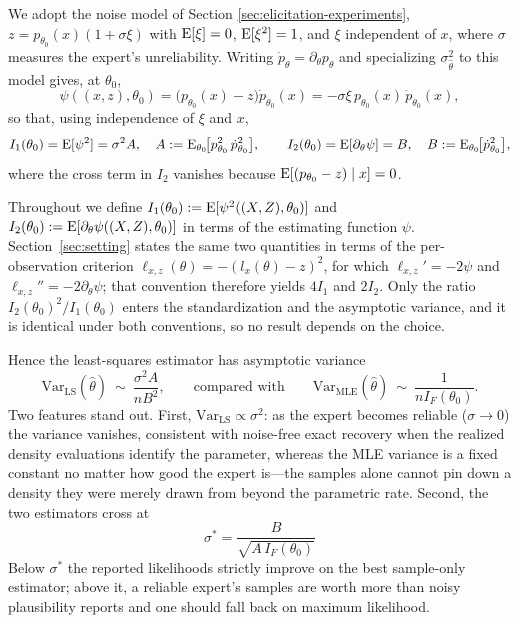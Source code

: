 We adopt the noise model of Section \ref{sec:elicitation-experiments}, $z=p_{\theta_0}(x)(1+\sigma\xi)$ with $\mathrm{E}[\xi]=0$, $\mathrm{E}[\xi^2]=1$, and $\xi$ independent of $x$, where $\sigma$ measures the expert's unreliability. Writing $\dot p_\theta = \partial_\theta p_\theta$ and specializing $\sigma_{\hat\theta}^2$ to this model gives, at $\theta_0$,
\[
\psi((x,z),\theta_0) = \big(p_{\theta_0}(x)-z\big)\dot p_{\theta_0}(x) = -\sigma\xi\, p_{\theta_0}(x)\,\dot p_{\theta_0}(x),
\]
so that, using independence of $\xi$ and $x$,
\[
I_1(\theta_0)=\mathrm{E}[\psi^2]=\sigma^2 A,\quad A:=\mathrm{E}_{\theta_0}\!\big[p_{\theta_0}^2\,\dot p_{\theta_0}^2\big], \qquad
I_2(\theta_0)=\mathrm{E}[\partial_\theta\psi]=B,\quad B:=\mathrm{E}_{\theta_0}\!\big[\dot p_{\theta_0}^2\big],
\]
where the cross term in $I_2$ vanishes because $\mathrm{E}[(p_{\theta_0}-z)\mid x]=0$.

\begin{remark}
Throughout we define $I_1(\theta_0):=\mathrm{E}[\psi^2((X,Z),\theta_0)]$ and
$I_2(\theta_0):=\mathrm{E}[\partial_\theta\psi((X,Z),\theta_0)]$ in terms of the
estimating function $\psi$. Section~\ref{sec:setting} states the same two
quantities in terms of the per-observation criterion
$\ell_{x,z}(\theta)=-(l_x(\theta)-z)^2$, for which
$\ell_{x,z}'=-2\psi$ and $\ell_{x,z}''=-2\partial_\theta\psi$; that convention
therefore yields $4I_1$ and $2I_2$. Only the ratio $I_2(\theta_0)^2/I_1(\theta_0)$
enters the standardization and the asymptotic variance, and it is identical under
both conventions, so no result depends on the choice.
\end{remark}

Hence the least-squares estimator has asymptotic variance
\[
\mathrm{Var}_{\mathrm{LS}}(\hat\theta)\ \sim\ \frac{\sigma^2 A}{nB^2},
\qquad\text{compared with}\qquad
\mathrm{Var}_{\mathrm{MLE}}(\hat\theta)\ \sim\ \frac{1}{nI_F(\theta_0)}.
\]
Two features stand out. First, $\mathrm{Var}_{\mathrm{LS}}\propto\sigma^2$: as the expert becomes reliable ($\sigma\to0$) the variance vanishes, consistent with noise-free exact recovery when the realized density evaluations identify the parameter, whereas the MLE variance is a fixed constant no matter how good the expert is---the samples alone cannot pin down a density they were merely drawn from beyond the parametric rate. Second, the two estimators cross at
\[
\boxed{\ \sigma^\ast = \frac{B}{\sqrt{A\,I_F(\theta_0)}}\ }
\]
Below $\sigma^\ast$ the reported likelihoods strictly improve on the best sample-only estimator; above it, a reliable expert's samples are worth more than noisy plausibility reports and one should fall back on maximum likelihood.

